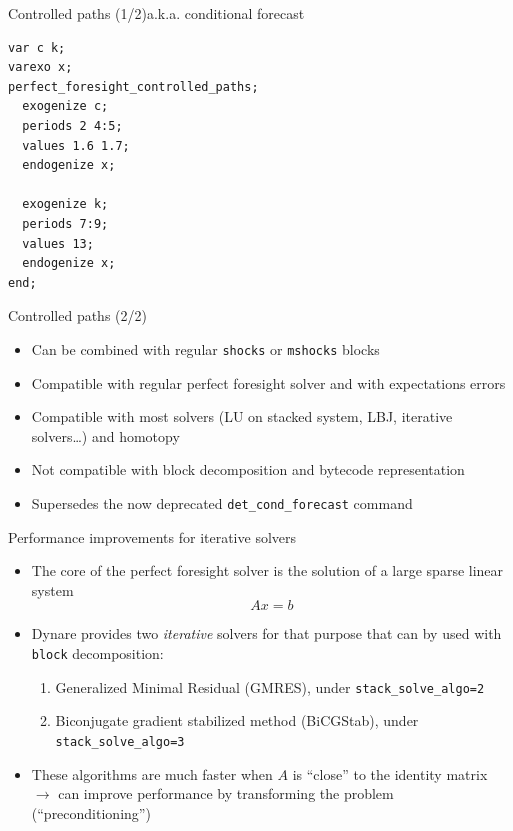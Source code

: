 \documentclass[handout,usepdftitle=false,xcolor=dvipsnames,aspectratio=169]{beamer}
\begin{document}
\begin{frame}[fragile]{Controlled paths (1/2)}{a.k.a. conditional forecast}
  \begin{verbatim}
var c k;
varexo x;
perfect_foresight_controlled_paths;
  exogenize c;
  periods 2 4:5;
  values 1.6 1.7;
  endogenize x;

  exogenize k;
  periods 7:9;
  values 13;
  endogenize x;
end;
\end{verbatim}
\end{frame}

\begin{frame}{Controlled paths (2/2)}
  \begin{itemize}
    \item Can be combined with regular \texttt{shocks} or \texttt{mshocks} blocks
    \item Compatible with regular perfect foresight solver and with expectations errors
    \item Compatible with most solvers (LU on stacked system, LBJ, iterative
          solvers\ldots) and homotopy
    \item Not compatible with block decomposition and bytecode representation
    \item Supersedes the now deprecated \texttt{det\_cond\_forecast} command
  \end{itemize}
\end{frame}

\begin{frame}{Performance improvements for iterative solvers}
  \begin{itemize}
    \item The core of the perfect foresight solver is the solution of a large
          sparse linear system
          \begin{equation}
            Ax=b
          \end{equation}
    \item Dynare provides two \textit{iterative} solvers for that purpose that can by used with \texttt{block} decomposition:
          \begin{enumerate}
            \item Generalized Minimal Residual (GMRES), under \texttt{stack\_solve\_algo=2}
            \item Biconjugate gradient stabilized method (BiCGStab), under \texttt{stack\_solve\_algo=3}
          \end{enumerate}
    \item These algorithms are much faster when $A$ is “close” to the identity
          matrix\\
          $\rightarrow$ can improve performance by transforming the problem (``preconditioning'')
  \end{itemize}
\end{frame}
\end{document}
